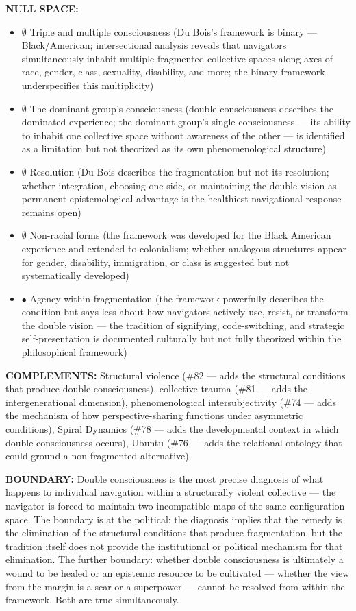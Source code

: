 \textbf{NULL SPACE:}

\begin{itemize}[nosep,leftmargin=*]
  \item $\emptyset$ Triple and multiple consciousness (Du Bois's framework is binary — Black/\allowbreak American; intersectional analysis reveals that navigators simultaneously inhabit multiple fragmented collective spaces along axes of race, gender, class, sexuality, disability, and more; the binary framework underspecifies this multiplicity)
  \item $\emptyset$ The dominant group's consciousness (double consciousness describes the dominated experience; the dominant group's single consciousness — its ability to inhabit one collective space without awareness of the other — is identified as a limitation but not theorized as its own phenomenological structure)
  \item $\emptyset$ Resolution (Du Bois describes the fragmentation but not its resolution; whether integration, choosing one side, or maintaining the double vision as permanent epistemological advantage is the healthiest navigational response remains open)
  \item $\emptyset$ Non-racial forms (the framework was developed for the Black American experience and extended to colonialism; whether analogous structures appear for gender, disability, immigration, or class is suggested but not systematically developed)
  \item $\bullet$ Agency within fragmentation (the framework powerfully describes the condition but says less about how navigators actively use, resist, or transform the double vision — the tradition of signifying, code-switching, and strategic self-presentation is documented culturally but not fully theorized within the philosophical framework)
\end{itemize}


\textbf{COMPLEMENTS:} Structural violence (\#82 — adds the structural conditions that produce double consciousness), collective trauma (\#81 — adds the intergenerational dimension), phenomenological intersubjectivity (\#74 — adds the mechanism of how perspective-sharing functions under asymmetric conditions), Spiral Dynamics (\#78 — adds the developmental context in which double consciousness occurs), Ubuntu (\#76 — adds the relational ontology that could ground a non-fragmented alternative).


\textbf{BOUNDARY:} Double consciousness is the most precise diagnosis of what happens to individual navigation within a structurally violent collective — the navigator is forced to maintain two incompatible maps of the same configuration space. The boundary is at the political: the diagnosis implies that the remedy is the elimination of the structural conditions that produce fragmentation, but the tradition itself does not provide the institutional or political mechanism for that elimination. The further boundary: whether double consciousness is ultimately a wound to be healed or an epistemic resource to be cultivated — whether the view from the margin is a scar or a superpower — cannot be resolved from within the framework. Both are true simultaneously.


